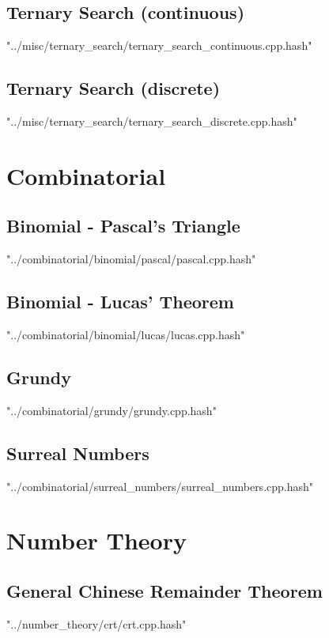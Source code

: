 \documentclass [a4paper,5pt,oneside, landscape]{article}
\begin{document}
\begin{multicols}{3}
\subsection{ Ternary Search (continuous)}
 {"../misc/ternary_search/ternary_search_continuous.cpp.hash"}


\subsection{ Ternary Search (discrete)}
 {"../misc/ternary_search/ternary_search_discrete.cpp.hash"}



\section{Combinatorial}
\subsection{ Binomial - Pascal's Triangle}
 {"../combinatorial/binomial/pascal/pascal.cpp.hash"}


\subsection{ Binomial - Lucas' Theorem}
 {"../combinatorial/binomial/lucas/lucas.cpp.hash"}


\subsection{ Grundy}
 {"../combinatorial/grundy/grundy.cpp.hash"}


\subsection{ Surreal Numbers}
 {"../combinatorial/surreal_numbers/surreal_numbers.cpp.hash"}



\section{Number Theory}
\subsection{ General Chinese Remainder Theorem}
 {"../number_theory/crt/crt.cpp.hash"}



\end{multicols}
\end{document}
